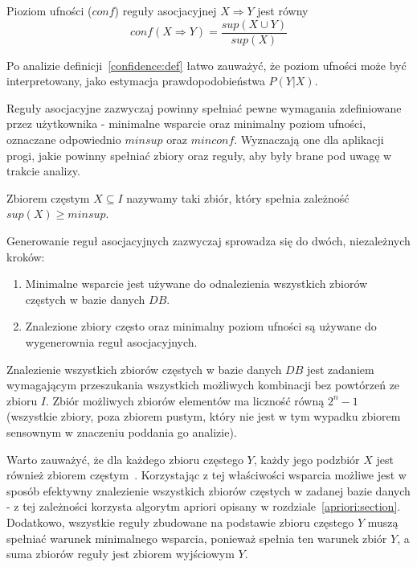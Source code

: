 \begin{df}\label{confidence:def}
Pioziom ufności ($conf$) reguły asocjacyjnej $X \Rightarrow Y$ jest równy 
\begin{equation}
	conf(X \Rightarrow Y) = \frac{sup(X \cup Y)}{sup(X)}
\end{equation}
\end{df}

Po analizie definicji~\ref{confidence:def} łatwo zauważyć, że poziom ufności może być interpretowany, jako estymacja prawdopodobieństwa $P(Y | X)$.


Reguły asocjacyjne zazwyczaj powinny spełniać pewne wymagania zdefiniowane przez użytkownika - minimalne wsparcie oraz minimalny poziom ufności, oznaczane odpowiednio $minsup$ oraz $minconf$. Wyznaczają one dla aplikacji progi, jakie powinny spełniać zbiory oraz reguły, aby były brane pod uwagę w trakcie analizy.

\begin{df}
Zbiorem częstym $X \subseteq I$ nazywamy taki zbiór, który spełnia zależność $sup(X) \geq minsup$.
\end{df}

Generowanie reguł asocjacyjnych zazwyczaj sprowadza się do dwóch, niezależnych kroków:
\begin{enumerate}
	\item Minimalne wsparcie jest używane do odnalezienia wszystkich zbiorów częstych w bazie danych $DB$.
	\item Znalezione zbiory często oraz minimalny poziom ufności są używane do wygenerownia reguł asocjacyjnych.
\end{enumerate}

Znalezienie wszystkich zbiorów częstych w bazie danych $DB$ jest zadaniem wymagającym przeszukania wszystkich możliwych kombinacji bez powtórzeń ze zbioru $I$. Zbiór możliwych zbiorów elementów ma liczność równą $2^n - 1$ (wszystkie zbiory, poza zbiorem pustym, który nie jest w tym wypadku zbiorem sensownym w znaczeniu poddania go analizie). 

Warto zauważyć, że dla każdego zbioru częstego $Y$, każdy jego podzbiór $X$ jest również zbiorem częstym~\cite{Problem:Statement}. Korzystając z tej właściwości wsparcia możliwe jest w sposób efektywny znalezienie wszystkich zbiorów częstych w zadanej bazie danych - z tej zależności korzysta algorytm apriori opisany w rozdziale~\ref{apriori:section}. Dodatkowo, wszystkie reguły zbudowane na podstawie zbioru częstego $Y$ muszą spełniać warunek minimalnego wsparcia, ponieważ spełnia ten warunek zbiór $Y$, a suma zbiorów reguły jest zbiorem wyjściowym $Y$.

